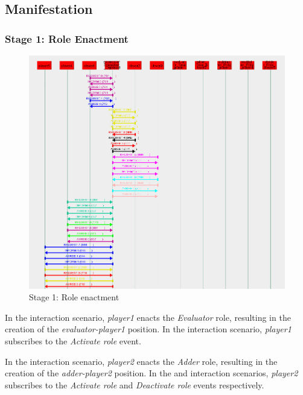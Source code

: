 \subsection*{Manifestation}

\subsubsection*{Stage 1: Role Enactment}

\begin{figure}[H]
	\centering
	\includegraphics[width=\textwidth]{images/examples/example2-stage1.png}
	\caption{Stage 1: Role enactment}
	\label{figure:example2-stage1}
\end{figure}

In the {} interaction scenario, \textit{player1} enacts the \textit{Evaluator} role, resulting in the creation of the \textit{evaluator-player1} position.
In the {} interaction scenario, \textit{player1} subscribes to the \textit{Activate role} event.

In the {} interaction scenario, \textit{player2} enacts the \textit{Adder} role, resulting in the creation of the \textit{adder-player2} position.
In the {} and {} interaction scenarios, \textit{player2} subscribes to the \textit{Activate role} and \textit{Deactivate role} events respectively.

